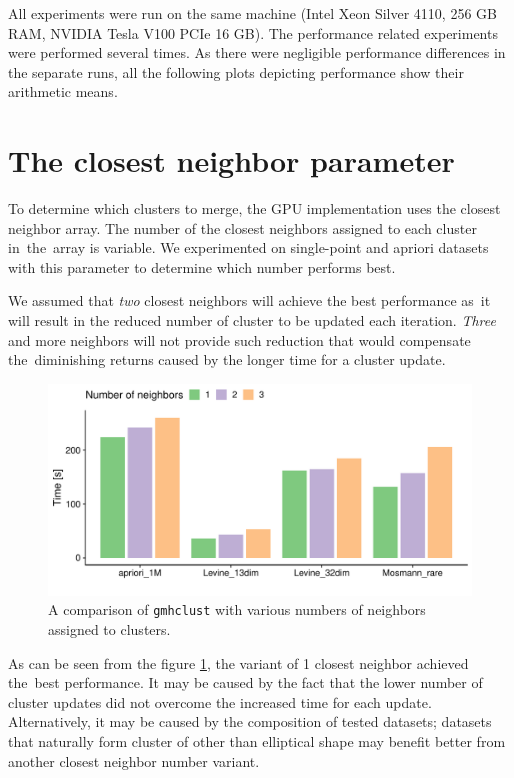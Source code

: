 All experiments were run on the same machine (Intel Xeon Silver 4110, 256 GB RAM, NVIDIA Tesla V100 PCIe 16 GB). The performance related experiments were performed several times. As there were negligible performance differences in the separate runs, all the following plots depicting performance show their arithmetic means. 

\section{The closest neighbor parameter}

To determine which clusters to merge, the GPU implementation uses the closest neighbor array. The number of the closest neighbors assigned to each cluster in~the~array is variable. We experimented on single-point and apriori datasets with this parameter to determine which number performs best. 

We assumed that \emph{two} closest neighbors will achieve the best performance as~it will result in the reduced number of cluster to be updated each iteration. \emph{Three} and more neighbors will not provide such reduction that would compensate the~diminishing returns caused by the longer time for a cluster update.

\begin{figure}\centering
	\includegraphics[width=\linewidth]{img/neighbor_compare}
	\caption{A comparison of \texttt{gmhclust} with various numbers of neighbors assigned to clusters.}
	\label{fig04:neigh}
\end{figure}

As can be seen from the figure \ref{fig04:neigh}, the variant of 1 closest neighbor achieved the~best performance. It may be caused by the fact that the lower number of cluster updates did not overcome the increased time for each update. Alternatively, it may be caused by the composition of tested datasets; datasets that naturally form cluster of other than elliptical shape may benefit better from another closest neighbor number variant.

